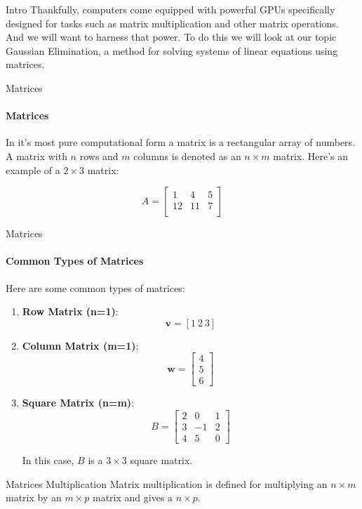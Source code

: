 \documentclass{beamer}
\begin{document}
\begin{frame}{Intro}
Thankfully, computers come equipped with powerful GPUs specifically designed for tasks such as matrix multiplication and other matrix operations. And we will want to harness that power. To do this we will look at our topic Gaussian Elimination, a method for solving systems of linear equations using matrices.
\end{frame}

\begin{frame}{Matrices}
\framesubtitle{Matrices}
In it's most pure computational form a matrix is a rectangular array of numbers. A matrix with \(n\) rows and \(m\) columns is denoted as an \(n \times m\) matrix. Here's an example of a \(2 \times 3\) matrix:

\[
A = 
\begin{bmatrix}
    1 & 4 & 5 \\
    12 & 11 & 7 \\
\end{bmatrix}
\]  
\end{frame}

\begin{frame}{Matrices}
\framesubtitle{Common Types of Matrices}
Here are some common types of matrices:

\begin{enumerate}
    \item \textbf{Row Matrix (n=1)}:
    \[
    \mathbf{v} = [1 \ 2 \ 3]
    \]
    \item \textbf{Column Matrix (m=1)}: 
    \[
    \mathbf{w} =
    \begin{bmatrix}
        4 \\
        5 \\
        6
    \end{bmatrix}
    \]
    
    \item \textbf{Square Matrix (n=m)}: 
    \[
    B =
    \begin{bmatrix}
        2 & 0 & 1 \\
        3 & -1 & 2 \\
        4 & 5 & 0
    \end{bmatrix}
    \]
    
    In this case, \(B\) is a \(3 \times 3\) square matrix.
    
\end{enumerate}
\end{frame}

\begin{frame}{Matrices Multiplication}
Matrix multiplication is defined for multiplying an \(n \times m\) matrix by an \(m \times p\) matrix and gives a  \(n \times p\).    
\end{frame}
\end{document}
